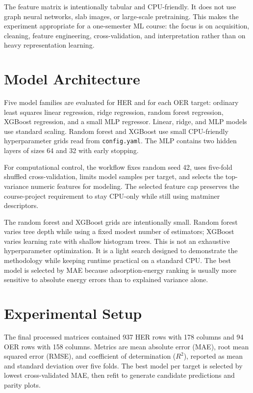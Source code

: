 \documentclass[conference]{IEEEtran}
\begin{document}
The feature matrix is intentionally tabular and CPU-friendly. It does not use graph neural networks, slab images, or large-scale pretraining. This makes the experiment appropriate for a one-semester ML course: the focus is on acquisition, cleaning, feature engineering, cross-validation, and interpretation rather than on heavy representation learning.

\section{Model Architecture}
Five model families are evaluated for HER and for each OER target: ordinary least squares linear regression, ridge regression, random forest regression, XGBoost regression, and a small MLP regressor. Linear, ridge, and MLP models use standard scaling. Random forest and XGBoost use small CPU-friendly hyperparameter grids read from \texttt{config.yaml}. The MLP contains two hidden layers of sizes 64 and 32 with early stopping.

For computational control, the workflow fixes random seed 42, uses five-fold shuffled cross-validation, limits model samples per target, and selects the top-variance numeric features for modeling. The selected feature cap preserves the course-project requirement to stay CPU-only while still using matminer descriptors.

The random forest and XGBoost grids are intentionally small. Random forest varies tree depth while using a fixed modest number of estimators; XGBoost varies learning rate with shallow histogram trees. This is not an exhaustive hyperparameter optimization. It is a light search designed to demonstrate the methodology while keeping runtime practical on a standard CPU. The best model is selected by MAE because adsorption-energy ranking is usually more sensitive to absolute energy errors than to explained variance alone.

\section{Experimental Setup}
The final processed matrices contained 937 HER rows with 178 columns and 94 OER rows with 158 columns. Metrics are mean absolute error (MAE), root mean squared error (RMSE), and coefficient of determination ($R^2$), reported as mean and standard deviation over five folds. The best model per target is selected by lowest cross-validated MAE, then refit to generate candidate predictions and parity plots.
\end{document}
